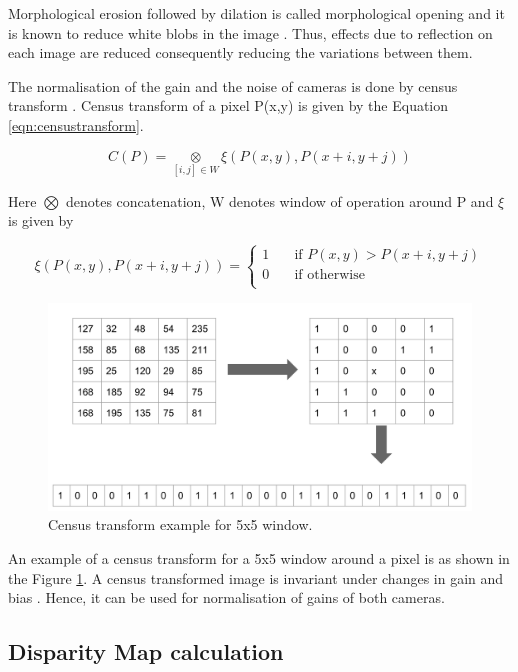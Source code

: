 Morphological erosion followed by dilation is called morphological opening and it is known to reduce white blobs in the image \cite{Rosli2014}. Thus, effects due to reflection on each image are reduced consequently reducing the variations between them.

The normalisation of the gain and the noise of cameras is done by census transform \cite{Zabih1994}\cite{young_ki_baik_fast_2006}. Census transform of a pixel P(x,y) is given by the Equation \ref{eqn:censustransform}.

\begin{equation}
  C(P) = \underset{[i,j]\in W}{\otimes} {\xi (P(x,y),P(x+i,y+j))} 
  \label{eqn:censustransform}
\end{equation}

Here $\bigotimes$ denotes concatenation, W denotes window of operation around P and $\xi$ is given by 

\[ \xi (P(x,y),P(x+i,y+j)) =
  \begin{cases}
    1       & \quad \text{if } P(x,y)>P(x+i,y+j)\\
    0  & \quad \text{if } \text{otherwise}\\
  \end{cases}
\]

\begin{figure}[!htbp]
    \center
    \includegraphics[width=.8\linewidth]{figures/Censustransform_example}
    \caption{Census transform example for 5x5 window.}
    \label{fig:censusexample}
\end{figure}

An example of a census transform for a 5x5 window around a pixel is as shown in the Figure \ref{fig:censusexample}. A census transformed image is invariant under changes in gain and bias \cite{young_ki_baik_fast_2006}. Hence, it can be used for normalisation of gains of both cameras.

\subsection{Disparity Map calculation}
\label{s:algorithm:dmcalculation}

